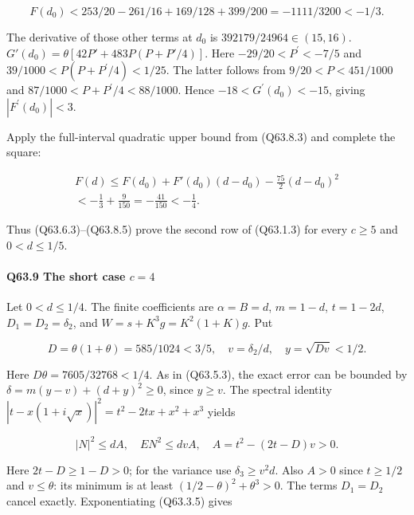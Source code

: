 \[
F(d_0)<253/20-261/16+169/128+399/200
=-1111/3200<-1/3.
\tag{Q63.8.4}\label{eq:Q63:Q63:8:4}
\]

The derivative of those other terms at $d_0$ is $392179/24964\in(15,\allowbreak  16)$.
$G'(d_0)=\allowbreak \theta[42P'+483P(P+P'/4)]$.
Here $-29/20<\allowbreak P^\prime<\allowbreak -7/5$ and $39/1000<\allowbreak P(P+P^\prime/4)<\allowbreak 1/25$. The latter follows from
$9/20<\allowbreak P<\allowbreak 451/1000$ and $87/1000<\allowbreak P+P^\prime/4<\allowbreak 88/1000$.
Hence $-18<\allowbreak G^\prime(d_0)<\allowbreak -15$, giving $|F^\prime(d_0)|<\allowbreak 3$.

Apply the full-interval quadratic upper bound from (Q63.8.3) and complete the square:

\[
\begin{gathered}
F(d)\le F(d_0)+F'(d_0)(d-d_0)-\frac{75}{2}(d-d_0)^2\\
<-\frac13+\frac9{150}=-\frac{41}{150}<-\frac14.
\end{gathered}\tag{Q63.8.5}\label{eq:Q63:Q63:8:5}
\]


Thus (Q63.6.3)--(Q63.8.5) prove the second row of (Q63.1.3) for every $c\ge\allowbreak 5$ and $0<\allowbreak d\le\allowbreak 1/5$.

\paragraph{Q63.9 The short case $c=\allowbreak 4$}

Let $0<\allowbreak d\le\allowbreak 1/4$. The finite coefficients are $\alpha=\allowbreak B=\allowbreak d$, $m=\allowbreak 1-d$, $t=\allowbreak 1-2d$,
$D_1=\allowbreak D_2=\allowbreak \delta_2$, and $W=\allowbreak s+K^3g=\allowbreak K^2(1+K)g$. Put

\[
D=\theta(1+\theta)=585/1024<3/5,\quad v=\delta_2/d,
\quad y=\sqrt{Dv}<1/2.
\]

Here $D\theta=\allowbreak 7605/32768<\allowbreak 1/4$. As in (Q63.5.3), the exact error can be bounded by
$\delta=\allowbreak m(y-v)+(d+y)^2\ge\allowbreak 0$, since $y\ge\allowbreak  v$.
The spectral identity $|t-x(1+i\sqrt x)|^2=\allowbreak t^2-2tx+x^2+x^3$ yields

\[
|N|^2\le d A,\quad EN^2\le d v A,
\quad A=t^2-(2t-D)v>0.
\tag{Q63.9.1}\label{eq:Q63:Q63:9:1}
\]

Here $2t-D\ge\allowbreak 1-D>\allowbreak 0$; for the variance use $\delta_3\ge\allowbreak  v^2d$. Also $A>\allowbreak 0$ since $t\ge\allowbreak 1/2$ and $v\le\allowbreak \theta$:
its minimum is at least $(1/2-\theta)^2+\theta^3>\allowbreak 0$.
The terms $D_1=\allowbreak D_2$ cancel exactly. Exponentiating (Q63.3.5) gives

